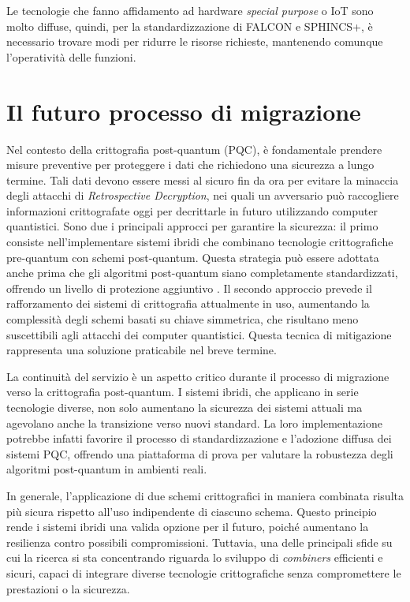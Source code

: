 Le tecnologie che fanno affidamento ad hardware \textit{special purpose} o IoT sono molto diffuse, quindi, per la standardizzazione di FALCON e SPHINCS+, è necessario trovare modi per ridurre le risorse richieste, mantenendo comunque l'operatività delle funzioni.

\section{Il futuro processo di migrazione}

Nel contesto della crittografia post-quantum (PQC), è fondamentale prendere misure preventive per proteggere i dati che richiedono una sicurezza a lungo termine. Tali dati devono essere messi al sicuro fin da ora per evitare la minaccia degli attacchi di \textit{Retrospective Decryption}, nei quali un avversario può raccogliere informazioni crittografate oggi per decrittarle in futuro utilizzando computer quantistici. Sono due i principali approcci per garantire la sicurezza: il primo consiste nell'implementare sistemi ibridi che combinano tecnologie crittografiche pre-quantum con schemi post-quantum. Questa strategia può essere adottata anche prima che gli algoritmi post-quantum siano completamente standardizzati, offrendo un livello di protezione aggiuntivo \cite{enisa-pqc}. Il secondo approccio prevede il rafforzamento dei sistemi di crittografia attualmente in uso, aumentando la complessità degli schemi basati su chiave simmetrica, che risultano meno suscettibili agli attacchi dei computer quantistici. Questa tecnica di mitigazione rappresenta una soluzione praticabile nel breve termine.

La continuità del servizio è un aspetto critico durante il processo di migrazione verso la crittografia post-quantum. I sistemi ibridi, che applicano in serie tecnologie diverse, non solo aumentano la sicurezza dei sistemi attuali ma agevolano anche la transizione verso nuovi standard. La loro implementazione potrebbe infatti favorire il processo di standardizzazione e l'adozione diffusa dei sistemi PQC, offrendo una piattaforma di prova per valutare la robustezza degli algoritmi post-quantum in ambienti reali.

In generale, l'applicazione di due schemi crittografici in maniera combinata risulta più sicura rispetto all'uso indipendente di ciascuno schema. Questo principio rende i sistemi ibridi una valida opzione per il futuro, poiché aumentano la resilienza contro possibili compromissioni. Tuttavia, una delle principali sfide su cui la ricerca si sta concentrando riguarda lo sviluppo di \textit{combiners} efficienti e sicuri, capaci di integrare diverse tecnologie crittografiche senza compromettere le prestazioni o la sicurezza.

